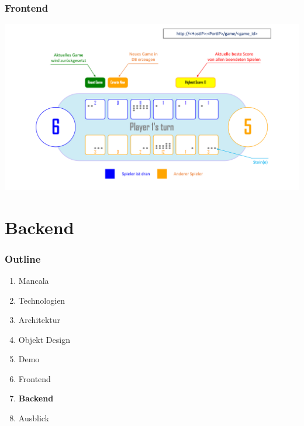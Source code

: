 \documentclass[
	10pt,
	t		%
]{beamer}
\begin{document}
\begin{frame}
\frametitle{Frontend}
\hspace*{-0.8cm}
\includegraphics[scale=0.36]{./pictures/GUI_Explanation.pdf}
\end{frame}

\section{Backend}
\begin{frame}
\frametitle{Outline}
\begin{enumerate}
\item Mancala
\item Technologien
\item Architektur
\item Objekt Design
\item Demo
\item Frontend
\item \textbf{Backend}
\item Ausblick
\end{enumerate}
\end{frame}
\end{document}
